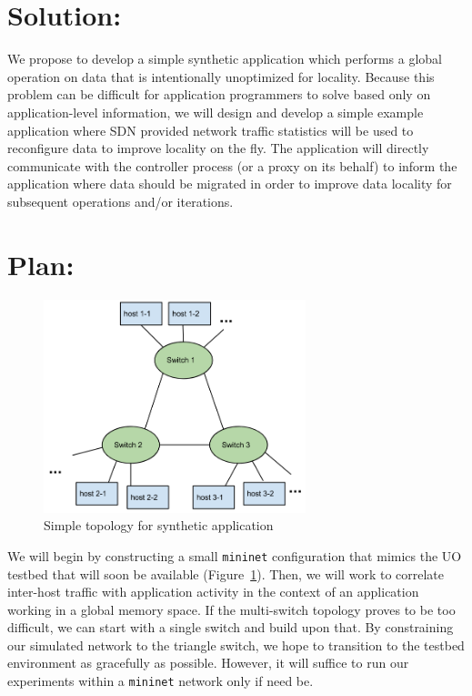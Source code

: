 \documentclass[12pt]{article}
\begin{document}
\section*{Solution:}
\label{solution}
We propose to develop a simple synthetic application which performs a global operation on data
that is intentionally unoptimized for locality.  Because this problem can be difficult for application
programmers to solve based only on application-level information, we will design and develop a simple
example application where SDN provided network traffic statistics will be used to reconfigure data to improve locality on the
fly.  The application will directly communicate with the controller process (or a proxy on its behalf)
to inform the application where data should be migrated in order to improve data locality for subsequent
operations and/or iterations.

\section*{Plan:}
\label{plan}
\begin{figure}[t]
\centerline{\includegraphics[width=3.0in]{img/topo.png}}
\caption{Simple topology for synthetic application}
\label{fig:topo}
\end{figure}
We will begin by constructing a small \texttt{mininet} configuration that mimics the UO testbed
that will soon be available (Figure~\ref{fig:topo}).  Then, we will work to correlate
inter-host traffic with application activity in the context of an application working in 
a global memory space.  If the multi-switch topology proves to be too difficult, we can 
start with a single switch and build upon that.  By constraining our simulated network to the
triangle switch, we hope to transition to the testbed environment as gracefully as possible.  However,
it will suffice to run our experiments within a \texttt{mininet} network only if need be.
\end{document}
